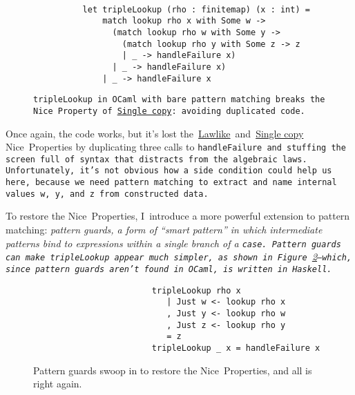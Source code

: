 \documentclass[manuscript,screen,review, 12pt, nonacm]{acmart}
\begin{document}
    \begin{figure}[ht]
        \begin{verbatim}

          let tripleLookup (rho : finitemap) (x : int) =
              match lookup rho x with Some w -> 
                (match lookup rho w with Some y -> 
                  (match lookup rho y with Some z -> z
                  | _ -> handleFailure x)
                | _ -> handleFailure x)
              | _ -> handleFailure x
            \end{verbatim}
        \caption{\tt{tripleLookup} in OCaml with bare pattern matching breaks
         the Nice~Property of~\hyperref[p2]{Single copy}: avoiding duplicated
         code.} 
                    
        \label{fig:pmtriplelookup}
    \end{figure}

    Once again, the code works, but it's lost
    the~\hyperref[p1]{Lawlike}~and~\hyperref[p2]{Single copy} Nice~Properties by
    duplicating three calls to \tt{handleFailure} and stuffing the screen full
    of syntax that distracts from the algebraic laws. Unfortunately, it's not
    obvious how a side condition could help us here, because we need pattern
    matching to extract and name internal values \tt{w}, \tt{y}, and~\tt{z}
    from constructed data.

    To restore the Nice~Properties, I~introduce a more powerful extension to
    pattern matching: \it{pattern guards}, a form of “smart pattern” in which
    intermediate patterns bind to expressions within a single branch of a
    \tt{case}. Pattern guards can make \tt{tripleLookup} appear \it{much}
    simpler, as shown in Figure~\ref{fig:guardtriplelookup}---which, since
    pattern guards aren't found in OCaml, is written in Haskell.

    \begin{figure}
        \begin{center}
        \begin{verbatim}
                        tripleLookup rho x
                           | Just w <- lookup rho x
                           , Just y <- lookup rho w
                           , Just z <- lookup rho y
                           = z
                        tripleLookup _ x = handleFailure x
        \end{verbatim}
        \end{center}    
    \caption{Pattern guards swoop in to restore the Nice~Properties, and all is
    right again.} 
    \label{fig:guardtriplelookup}
    \end{figure}
\end{document}
